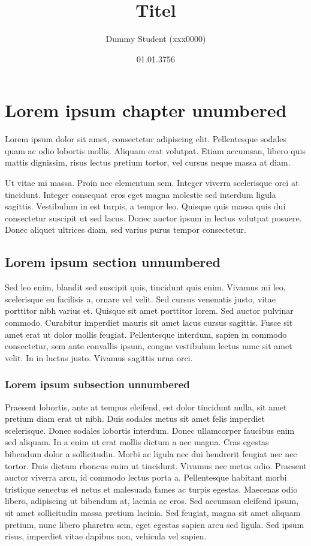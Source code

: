 \documentclass[a4paper,parskip=half,oneside]{scrbook}
\begin{document}
\title{Titel}
\author{Dummy Student (xxx0000)}
\date{01.01.3756}

\maketitle
\thispagestyle{empty}
\clearpage
\newpage

\tableofcontents
\newpage


\chapter*{Lorem ipsum chapter unumbered}
Lorem ipsum dolor sit amet, consectetur adipiscing elit. Pellentesque sodales quam ac odio lobortis mollis. Aliquam erat volutpat. Etiam accumsan, libero quis mattis dignissim, risus lectus pretium tortor, vel cursus neque massa at diam.

Ut vitae mi massa. Proin nec elementum sem. Integer viverra scelerisque orci at tincidunt. Integer consequat eros eget magna molestie sed interdum ligula sagittis. Vestibulum in est turpis, a tempor leo. Quisque quis massa quis dui consectetur suscipit ut sed lacus. Donec auctor ipsum in lectus volutpat posuere. Donec aliquet ultrices diam, sed varius purus tempor consectetur.

\section*{Lorem ipsum section unnumbered}
Sed leo enim, blandit sed suscipit quis, tincidunt quis enim. Vivamus mi leo, scelerisque eu facilisis a, ornare vel velit. Sed cursus venenatis justo, vitae porttitor nibh varius et. Quisque sit amet porttitor lorem. Sed auctor pulvinar commodo. Curabitur imperdiet mauris sit amet lacus cursus sagittis. Fusce sit amet erat ut dolor mollis feugiat. Pellentesque interdum, sapien in commodo consectetur, sem ante convallis ipsum, congue vestibulum lectus nunc sit amet velit. In in luctus justo. Vivamus sagittis urna orci.

\subsection*{Lorem ipsum subsection unnumbered}
Praesent lobortis, ante at tempus eleifend, est dolor tincidunt nulla,
sit amet pretium diam erat ut nibh. Duis sodales metus sit amet felis
imperdiet scelerisque. Donec sodales lobortis interdum. Donec ullamcorper
faucibus enim sed aliquam. In a enim ut erat mollis dictum a nec magna.
Cras egestas bibendum dolor a sollicitudin. Morbi ac ligula nec dui hendrerit
feugiat nec nec tortor. Duis dictum rhoncus enim ut tincidunt. Vivamus nec
metus odio. Praesent auctor viverra arcu, id commodo lectus porta a.
Pellentesque habitant morbi tristique senectus et netus et malesuada fames
ac turpis egestas. Maecenas odio libero, adipiscing ut bibendum at,
lacinia ac eros. Sed accumsan eleifend ipsum, sit amet sollicitudin
massa pretium lacinia. Sed feugiat, magna sit amet aliquam pretium, nunc
libero pharetra sem, eget egestas sapien arcu sed ligula. Sed ipsum risus,
imperdiet vitae dapibus non, vehicula vel sapien.
\end{document}
